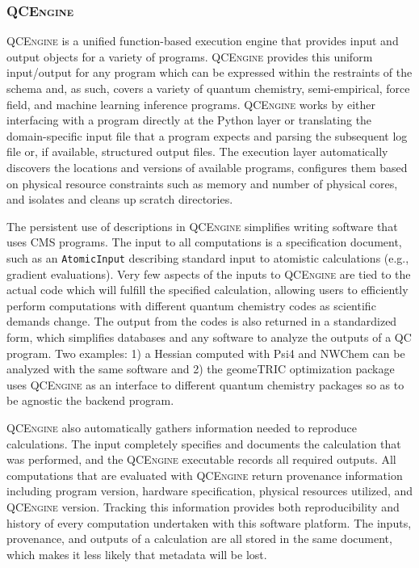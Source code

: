 \documentclass[journal=jctcce,manuscript=article]{achemso}
\newcommand{\qcskN}{QCSchema}
\newcommand{\qcngN}{QCEngine}
\newcommand{\qcsk}{{\sc{\qcskN}}\xspace}%
\newcommand{\qcng}{{\textsc{\qcngN}}\xspace}%
\begin{document}
\subsubsection{\qcng}

\qcng is a unified function-based execution engine that provides \qcsk input and output objects for a variety of programs.
\qcng provides this uniform input/output for any program which can be expressed within the restraints of the schema and, as such, covers a variety of quantum chemistry, semi-empirical, force field, and machine learning inference programs.
\qcng works by either interfacing with a program directly at the Python layer or translating the domain-specific input file that a program expects and parsing the subsequent log file or, if available, structured output files.
The execution layer automatically discovers the locations and versions of available programs, configures them based on physical resource constraints such as memory and number of physical cores, and isolates and cleans up scratch directories.

The persistent use of \qcsk descriptions in \qcng simplifies writing software that uses CMS programs.
The input to all computations is a \qcsk specification document, such as an \texttt{AtomicInput} describing standard input to atomistic calculations (e.g., gradient evaluations).
Very few aspects of the inputs to \qcng are tied to the actual code which will fulfill the specified calculation, allowing users to efficiently perform computations with different quantum chemistry codes as scientific demands change.
The output from the codes is also returned in a standardized form, which simplifies databases and any software to analyze the outputs of a QC program.
Two examples: 1) a Hessian computed with Psi4\cite{Parrish:2017:3185,Smith:2020:psi4} and NWChem\cite{Apra:2020:nwchem} can be analyzed with the same software and
2) the geomeTRIC optimization package\cite{ping2016geometric, GH20:geometric} uses \qcng as an interface to different quantum chemistry packages so as to be agnostic the backend program.

\qcng also automatically gathers information needed to reproduce calculations. 
The input \qcsk  completely specifies and documents the calculation that was performed, and the \qcng executable records all required outputs.
All computations that are evaluated with \qcng return provenance information including program version, hardware specification, physical resources utilized, and \qcng version.
Tracking this information provides both reproducibility and history of every computation undertaken with this software platform.
The inputs, provenance, and outputs of a calculation are all stored in the same document, which makes it less likely that metadata will be lost.
\end{document}
